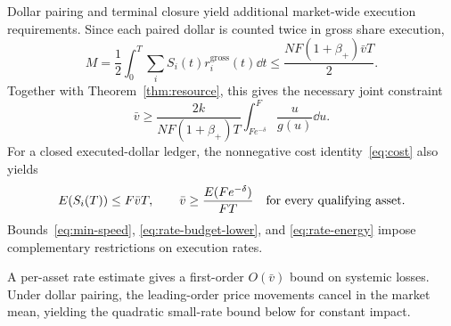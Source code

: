 \documentclass[review,hidelinks,onefignum,onetabnum]{siamonline250211}
\begin{document}
Dollar pairing and terminal closure yield additional market-wide execution requirements. Since each paired dollar is counted twice in gross share execution,
\begin{equation}\label{eq:rate-turnover}
 M=\frac12\int_0^T\sum_i S_i(t)r_i^{\mathrm{gross}}(t)\dd t
 \le\frac{NF(1+\beta_+)\bar v T}{2}.
\end{equation}
Together with Theorem~\ref{thm:resource}, this gives the necessary joint constraint
\begin{equation}\label{eq:rate-budget-lower}
 \ \bar v\ge\frac{2k}{NF(1+\beta_+)T}
 \int_{Fe^{-\delta}}^F\frac{u}{g(u)}\dd u.\ 
\end{equation}
For a closed executed-dollar ledger, the nonnegative cost identity~\eqref{eq:cost} also yields
\begin{equation}\label{eq:rate-energy}
 E(S_i(T))\le F\bar v T,\qquad
 \bar v\ge \frac{E(Fe^{-\delta})}{FT}
 \quad \hbox{for every qualifying asset.}
\end{equation}
Bounds~\eqref{eq:min-speed}, \eqref{eq:rate-budget-lower}, and \eqref{eq:rate-energy} impose complementary restrictions on execution rates.

A per-asset rate estimate gives a first-order $O(\bar v)$ bound on systemic losses. Under dollar pairing, the leading-order price movements cancel in the market mean, yielding the quadratic small-rate bound below for constant impact.
\end{document}
